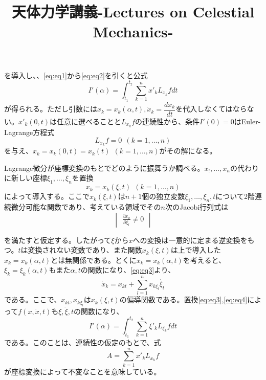 \documentclass[dvipdfmx, leqno]{jsbook}
\title{天体力学講義-Lectures on Celestial Mechanics-}
\begin{document}
\maketitle
\tableofcontents


    を導入し、、\eqref{eq:eq1}から\eqref{eq:eq2}を引くと公式
\begin{equation}
    I'(\alpha)= \int_{t_1}^{t_2} \sum_{k= 1}^n x'_kL_{x_k}f dt
\end{equation}
    が得られる。ただし引数には$x_k= x_k(\alpha, t), \dot{x}_k= \dfrac{dx_k}{dt}$を代入しなくてはならない。$x'_k(0, t)$は任意に選べることと$L_{x_k}f$の連続性から、条件$I'(0)= 0$はEuler-Lagrange方程式
\begin{equation}
    L_{x_k}f= 0\ \ (k= 1, \ldots, n)
\end{equation}
    を与え、$x_k= x_k(0, t)= x_k(t)\ \ (k= 1, \ldots, n)$がその解になる。

    Lagrange微分が座標変換のもとでどのように振舞うか調べる。$x_!, \ldots, x_n$の代わりに新しい座標$\xi_1, \ldots, \xi_n$を置換
\begin{equation} \label{eq:eq3}
    x_k= x_k(\xi, t)\ \ (k= 1, \ldots, n)
\end{equation}
    によって導入する。ここで$x_k(\xi, t)$は$n+ 1$個の独立変数$\xi_1, \ldots, \xi_n, t$について2階連続微分可能な関数であり、考えている領域でその$n$次のJacobi行列式は
\begin{equation}
    \begin{vmatrix}
    \frac{\partial x_k}{\partial \xi_l}\ne 0
    \end{vmatrix}
\end{equation}

    を満たすと仮定する。したがって$\xi$から$x$への変換は一意的に定まる逆変換をもつ。$t$は変換されない変数であり、また関数$x_k(\xi,t)$は上で導入した$x_k= x_k(\alpha, t)$とは無関係である。とくに$x_k= x_k(\alpha, t)$を考えると、$\xi_k= \xi_k(\alpha, t)$もまた$\alpha, t$の関数になり、\eqref{eq:eq3}より、
\begin{equation} \label{eq:eq4}
    \dot{x}_k= x_{kt}+ \sum_{l= 1} ^n x_{k\xi_l}\dot{\xi_l}   
\end{equation}
    である。ここで、$x_{kt}, x_{k\xi_l}$は$x_k(\xi, t)$の偏導関数である。置換\eqref{eq:eq3},\eqref{eq:eq4}によって$f(x, \dot{x}, t)$も$\xi, \dot{\xi}, t$の関数になり、
\begin{equation}
    I'(\alpha)= \int_{t_1}^{t_2} \sum_{k= 1}^n \xi'_kL_{\xi_k}f dt
\end{equation}
    である。このことは、連続性の仮定のもとで、式
\begin{equation}
    A= \sum_{k= 1}^n x'_kL_{x_k}f
\end{equation}
    が座標変換によって不変なことを意味している。
\end{document}
